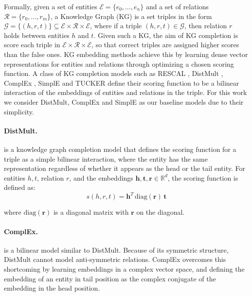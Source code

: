 \documentclass[11pt,a4paper, dvipsnames]{article}
\def\vh{{\bm{h}}}
\def\vr{{\bm{r}}}
\def\vt{{\bm{t}}}
\newcommand{\R}{\mathbb{R}}
\begin{document}
Formally, given a set of entities
$\mathcal{E} = \{e_0, \ldots, e_n\}$ and
a set of relations $\mathcal{R} = \{r_0, \ldots, r_m\}$, a Knowledge Graph (KG) is a set triples in the form $\mathcal{G} = \{(h, r, t)\} \subseteq \mathcal{E} \times \mathcal{R} \times \mathcal{E}$, where if a triple $(h, r, t) \in \mathcal{G}$, then relation $r$ holds between entities $h$ and $t$. Given such a KG, the aim of KG completion is score each triple in $\mathcal{E} \times \mathcal{R} \times \mathcal{E}$, so that correct triples are assigned higher scores than the false ones. KG embedding methods achieve this by learning dense vector representations for entities and relations through optimizing a chosen scoring function. 
A class of KG completion models such as RESCAL \citep{Nickel2012FactorizingData}, DistMult \citep{Yang2014EmbeddingBases}, ComplEx \citep{Trouillon2016ComplexPrediction}, SimplE \citep{Kazemi2018SimplEGraphs} and TUCKER \citep{balavzevic2019tucker} define their scoring function to be a bilinear interaction of the embeddings of entities and relations in the triple. For this work we consider DistMult, ComplEx and SimplE as our baseline models due to their simplicity.

\paragraph{DistMult.} \citep{Yang2014EmbeddingBases} is a knowledge graph completion model that defines the scoring function for a triple as a simple bilinear interaction, where the entity has the same representation regardless of whether it appears as the head or the tail entity. For entities $h, t$, relation $r$, and the embeddings $\vh, \vt, \vr \in \R^d$, the scoring function is defined as:
\begin{equation} \label{scorefun}
s(h, r, t) = \vh^T \, \text{diag}(\vr) \, \vt
\end{equation}

 where  $\text{diag}(\vr)$ is a diagonal matrix with $\vr$ on the diagonal.
 
 \paragraph{ComplEx.} \citep{Trouillon2016ComplexPrediction} is a bilinear model similar to DistMult. Because of its symmetric structure, DistMult cannot model anti-symmetric relations. ComplEx overcomes this shortcoming by learning embeddings in a complex vector space, and defining the embedding of an entity in tail position as the complex conjugate of the embedding in the head position.
 
\end{document}
